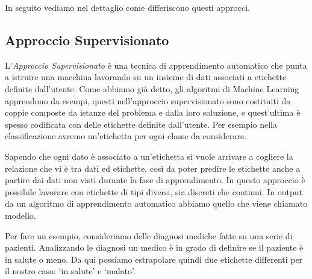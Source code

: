 \documentclass[a4paper,12pt]{report}
\begin{document}
\noindent In seguito vediamo nel dettaglio come differiscono questi approcci.

\subsection*{Approccio Supervisionato}
L'\textit{Approccio Supervisionato} \cite{machine_learning_oreilly}\cite{unsupervised_learning} è una tecnica di apprendimento automatico che punta a istruire una macchina lavorando su un insieme di dati associati a etichette definite dall'utente.
Come abbiamo già detto, gli algoritmi di Machine Learning apprendono da esempi, questi nell'approccio supervisionato sono costituiti da coppie composte da istanze del problema e dalla loro soluzione, e quest'ultima è spesso codificata con delle etichette definite dall'utente. Per esempio nella classificazione avremo un'etichetta per ogni classe da considerare.


Sapendo che ogni dato è associato a un'etichetta si vuole arrivare a cogliere la relazione che vi è tra dati ed etichette, così da poter predire le etichette anche a partire dai dati non visti durante la fase di apprendimento. 
In questo approccio è possibile lavorare con etichette di tipi diversi, sia discreti che continui.
In output da un algoritmo di apprendimento automatico abbiamo quello che viene chiamato modello. 



Per fare un esempio, consideriamo delle diagnosi mediche fatte su una serie  di pazienti. 
Analizzando le diagnosi un medico è in grado di definire se il paziente è in salute o meno. Da qui possiamo estrapolare quindi due etichette differenti per il nostro caso: `in salute' e `malato'. 
\end{document}
